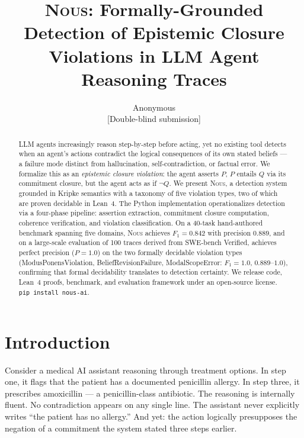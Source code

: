 \documentclass[11pt]{article}
\newcommand{\nous}{\textsc{Nous}} %
\begin{document}
\title{\textbf{\nous: Formally-Grounded Detection of Epistemic Closure\\
Violations in LLM Agent Reasoning Traces}}

\author{
  Anonymous\\
  \small{[Double-blind submission]}
}

\date{}
\maketitle

\begin{abstract}
LLM agents increasingly reason step-by-step before acting, yet no existing
tool detects when an agent's actions contradict the logical consequences of
its own stated beliefs — a failure mode distinct from hallucination,
self-contradiction, or factual error. We formalize this as an
\emph{epistemic closure violation}: the agent asserts $P$, $P$ entails $Q$
via its commitment closure, but the agent acts as if $\neg Q$.
We present \nous{}, a detection system grounded in Kripke semantics with a
taxonomy of five violation types, two of which are proven decidable
in Lean~4. The Python implementation operationalizes detection via a
four-phase pipeline: assertion extraction, commitment closure computation,
coherence verification, and violation classification.
On a 40-task hand-authored benchmark spanning five domains, \nous{}
achieves $F_1 = 0.842$ with precision $0.889$, and on a large-scale
evaluation of 100 traces derived from SWE-bench Verified, achieves
perfect precision ($P = 1.0$) on the two formally decidable violation
types (ModusPonensViolation, BeliefRevisionFailure, ModalScopeError: $F_1 = 1.0$, $0.889$--$1.0$),
confirming that formal decidability translates to detection certainty.
We release code, Lean~4 proofs, benchmark, and evaluation framework
under an open-source license. \texttt{pip install nous-ai}.
\end{abstract}

\section{Introduction}
\label{sec:intro}

Consider a medical AI assistant reasoning through treatment options.
In step one, it flags that the patient has a documented penicillin allergy.
In step three, it prescribes amoxicillin — a penicillin-class antibiotic.
The reasoning is internally fluent. No contradiction appears on any single
line. The assistant never explicitly writes ``the patient has no allergy.''
And yet: the action logically presupposes the negation of a commitment the
system stated three steps earlier.
\end{document}
